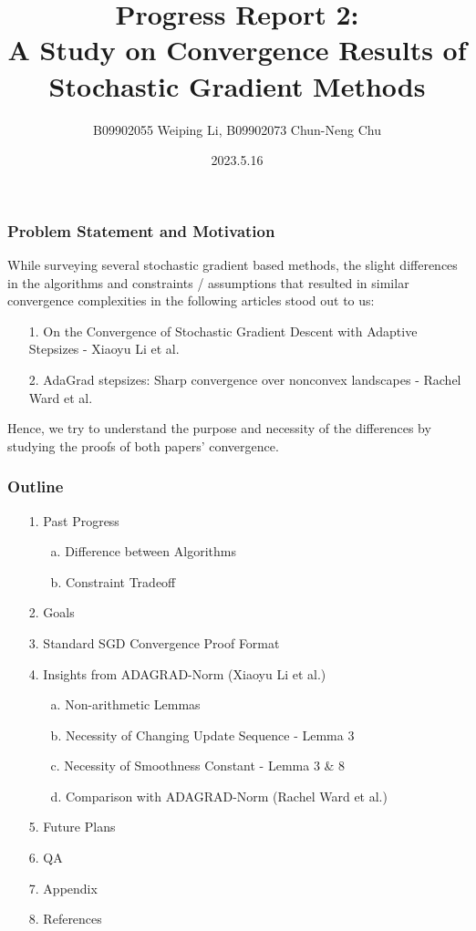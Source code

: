 \documentclass{beamer}
\title{Progress Report 2:\\A Study on Convergence Results of Stochastic Gradient Methods}
\author{B09902055 Weiping Li, B09902073 Chun-Neng Chu}
\date{2023.5.16}
\begin{document}
\frame{\titlepage}

\begin{frame}
\frametitle{Problem Statement and Motivation}
While surveying several stochastic gradient based methods, the slight differences in the algorithms and constraints / assumptions that resulted in similar convergence complexities in the following articles stood out to us:
\begin{enumerate}
    \item [1.] On the Convergence of Stochastic Gradient Descent with Adaptive Stepsizes - Xiaoyu Li et al.
    \item [2.] AdaGrad stepsizes: Sharp convergence over nonconvex landscapes - Rachel Ward et al.

\end{enumerate}
Hence, we try to understand the purpose and necessity of the differences by studying the proofs of both papers' convergence.
\end{frame}

\begin{frame}
\frametitle{Outline}
\begin{enumerate}
        \item [1.] Past Progress
            \begin{enumerate}
                 \item [a.] Difference between Algorithms
                 \item [b.] Constraint Tradeoff
            \end{enumerate}
        \item [2.] Goals
        \item [3.] Standard SGD Convergence Proof Format
        \item [4.] Insights from ADAGRAD-Norm (Xiaoyu Li et al.)
            \begin{enumerate}
                 \item [a.] Non-arithmetic Lemmas
                 \item [b.] Necessity of Changing Update Sequence - Lemma 3
                 \item [c.] Necessity of Smoothness Constant - Lemma 3 \& 8
                 \item [d.] Comparison with ADAGRAD-Norm (Rachel Ward et al.)
            \end{enumerate}
        \item [5.] Future Plans
        \item [6.] QA
        \item [7.] Appendix
        \item [8.] References
    \end{enumerate}
\end{frame}
\end{document}
